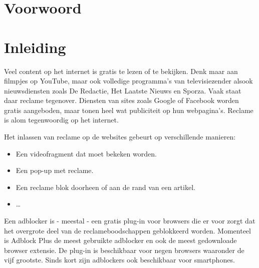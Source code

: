 \documentclass[pdftex,a4paper,12pt,twoside]{report}
\begin{document}
\begin{abstract}

\end{abstract}

\chapter*{Voorwoord}
\label{ch:voorwoord}



\tableofcontents

\printnoidxglossaries


\chapter{Inleiding}
\label{ch:inleiding}

Veel content op het internet is gratis te lezen of te bekijken. Denk maar aan filmpjes op YouTube, maar ook volledige programma’s van televisiezender alsook nieuwsdiensten zoals De Redactie, Het Laatste Nieuws en Sporza. Vaak staat daar reclame tegenover. Diensten van sites zoals Google of Facebook worden gratis aangeboden, maar tonen heel wat publiciteit op hun webpagina’s. Reclame is alom tegenwoordig op het internet.

Het inlassen van reclame op de websites gebeurt op verschillende manieren:

\begin{itemize}
	\item Een videofragment dat moet bekeken worden.

\item Een pop-up met reclame.

\item Een reclame blok doorheen of aan de rand van een artikel.

 \item …
\end{itemize}

Een adblocker is - meestal - een gratis plug-in voor browsers die er voor zorgt dat het overgrote deel van de reclameboodschappen geblokkeerd worden. Momenteel is Adblock Plus de meest gebruikte adblocker en ook de meest gedownloade browser extensie. De plug-in is beschikbaar voor negen browsers waaronder de vijf grootste. Sinds kort zijn adblockers ook beschikbaar voor smartphones.
\end{document}
